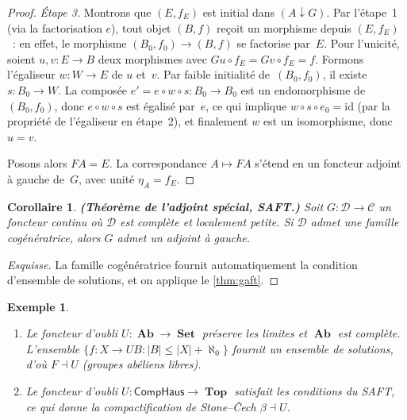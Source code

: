\documentclass[a4paper,12pt]{book}
\DeclareMathOperator{\Set}{\mathbf{Set}}
\DeclareMathOperator{\Ab}{\mathbf{Ab}}
\DeclareMathOperator{\Top}{\mathbf{Top}}
\newcommand{\id}{\mathrm{id}}
\newtheorem{corollaire}[theoreme]{Corollaire}
\newtheorem{exemple}[theoreme]{Exemple}
\begin{document}
\begin{proof}
\emph{Étape 3.} Montrons que $(E,f_E)$ est initial dans $(A\downarrow G)$.
Par l'étape~1 (via la factorisation $e$), tout objet $(B,f)$ reçoit un
morphisme depuis $(E,f_E)$~: en effet, le morphisme $(B_0,f_0)\to(B,f)$
se factorise par~$E$.
Pour l'unicité, soient $u,v\colon E\to B$ deux morphismes avec
$Gu\circ f_E = Gv\circ f_E = f$.
Formons l'égaliseur $w\colon W\to E$ de $u$ et~$v$.
Par faible initialité de~$(B_0,f_0)$, il existe $s\colon B_0\to W$.
La composée $e' = e\circ w\circ s\colon B_0\to B_0$
est un endomorphisme de $(B_0,f_0)$, donc $e\circ w\circ s$ est égalisé
par~$e$, ce qui implique $w\circ s\circ e_0 = \id$ (par la propriété
de l'égaliseur en étape~2), et finalement $w$ est un isomorphisme,
donc $u=v$.

Posons alors $FA = E$. La correspondance $A\mapsto FA$ s'étend
en un foncteur adjoint à gauche de~$G$, avec unité $\eta_A = f_E$.
\end{proof}

\begin{corollaire}\label{cor:saft}
\textbf{(Théorème de l'adjoint spécial, SAFT.)}
Soit $G\colon\mathcal{D}\to\mathcal{C}$ un foncteur continu
où $\mathcal{D}$ est complète et localement petite.
Si $\mathcal{D}$ admet une famille cogénératrice,
alors $G$ admet un adjoint à gauche.
\end{corollaire}

\begin{proof}[Esquisse]
La famille cogénératrice fournit automatiquement la condition d'ensemble
de solutions, et on applique le \autoref{thm:gaft}.
\end{proof}

\begin{exemple}\label{ex:applications-gaft}
\begin{enumerate}[label=(\roman*)]
\item {}
      Le foncteur d'oubli $U\colon\Ab\to\Set$ préserve les limites
      et $\Ab$ est complète. L'ensemble $\{f\colon X\to UB : |B|\leq|X|+\aleph_0\}$
      fournit un ensemble de solutions, d'où $F\dashv U$ (groupes abéliens libres).
\item {}
      Le foncteur d'oubli $U\colon\mathsf{CompHaus}\to\Top$
      satisfait les conditions du SAFT, ce qui donne la
      compactification de Stone--Čech $\beta\dashv U$.
\end{enumerate}
\end{exemple}
\end{document}
